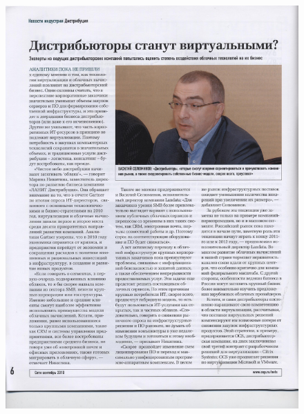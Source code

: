 \documentclass{book}
\begin{document}
\begin{figure}[H]
\begin{center}
\includegraphics[scale=0.25]{images/20.jpg}

\end{center}
\end{figure}
\end{document}
